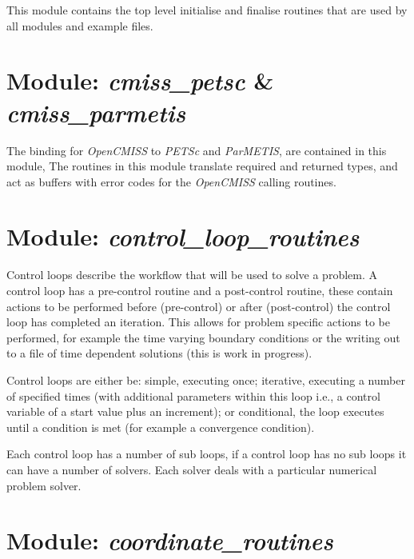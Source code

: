 This module contains the top level initialise and finalise routines that are
used by all modules and example files.


\section{Module: \emph{cmiss\_petsc} \& \emph{cmiss\_parmetis}}
\label{sec:cmisspetscandcmissparmetis}

The binding for \emph{OpenCMISS} to \emph{PETSc} and \emph{ParMETIS}, 
are contained in this module, The routines in this module translate 
required and returned types, and act as buffers with error codes for the 
\emph{OpenCMISS} calling routines.


\section{Module: \emph{control\_loop\_routines}}
\label{sec:controllooproutines}

Control loops describe the workflow that will be used to solve a problem.
A control loop has a pre-control routine and a post-control routine, these 
contain actions to be performed before (pre-control) or after (post-control) 
the control loop has completed an iteration. This allows for problem specific 
actions to be performed, for example the time varying boundary conditions or 
the writing out to a file of time dependent solutions (this is work in
progress).

Control loops are either be: simple, executing once; iterative, executing a
number of specified times (with additional parameters within this loop i.e., 
a control variable of a start value plus an increment); or conditional, the 
loop executes until a condition is met (for example a convergence condition).

Each control loop has a number of sub loops, if a control loop has no sub loops 
it can have a number of solvers. Each solver deals with a particular numerical 
problem solver.




\section{Module: \emph{coordinate\_routines}}
\label{sec:coordinateroutines}

